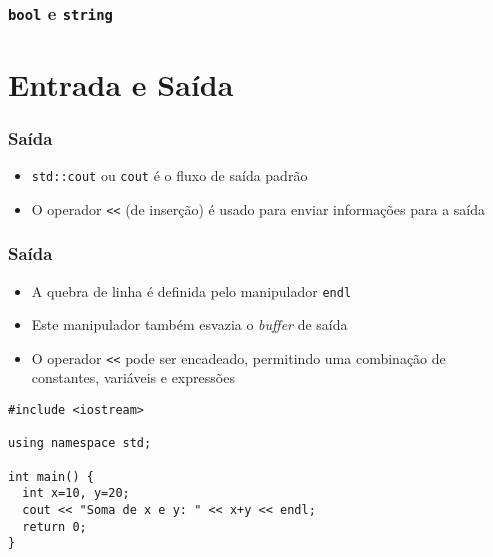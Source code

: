 \documentclass[aspectratio=169]{beamer}
\begin{document}
\begin{frame}[fragile]\frametitle{\texttt{bool} e \texttt{string}}

\end{frame}

\section{Entrada e Saída}

\begin{frame}[fragile]\frametitle{Saída}
\begin{itemize}
	\item \texttt{std::cout} ou \texttt{cout} é o fluxo de saída padrão
	\item O operador \texttt{\textless{}\textless} (de inserção) é usado para enviar informações para a saída
\end{itemize}

\end{frame}

\begin{frame}[fragile]\frametitle{Saída}
\begin{itemize}
	\item A quebra de linha é definida pelo manipulador \texttt{endl}
	\item Este manipulador também esvazia o \emph{buffer} de saída
	\item O operador \texttt{\textless{}\textless} pode ser encadeado, permitindo uma combinação de constantes, variáveis e expressões
\end{itemize}
\begin{lstlisting}
#include <iostream>

using namespace std;

int main() {
  int x=10, y=20;
  cout << "Soma de x e y: " << x+y << endl;
  return 0;
}
\end{lstlisting}
\end{frame}
\end{document}
